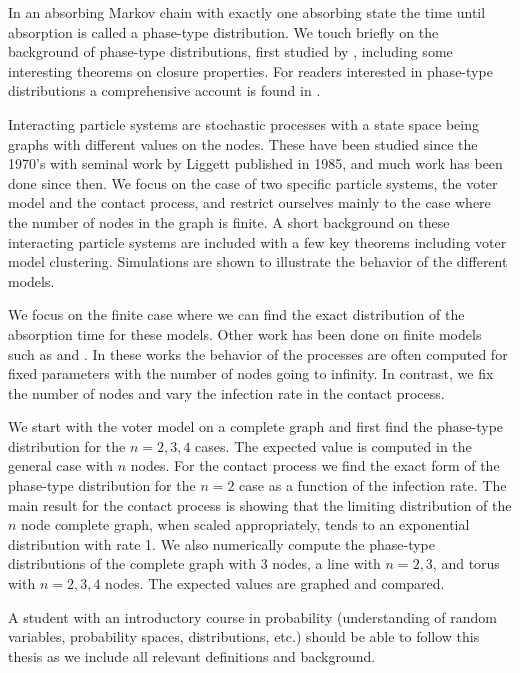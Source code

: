 In an absorbing Markov chain with exactly one absorbing state the time until absorption is called a phase-type distribution.
We touch briefly on the background of phase-type distributions, first studied by \cite{neuts1975}, including some interesting theorems on closure properties.
For readers interested in phase-type distributions a comprehensive account is found in \cite{neuts1981}.

Interacting particle systems are stochastic processes with a state space being graphs with different values on the nodes.
These have been studied since the 1970's with seminal work by Liggett published in 1985, and much work has been done since then.
We focus on the case of two specific particle systems, the voter model and the contact process, and restrict ourselves mainly to the case where the number of nodes in the graph is finite.
A short background on these interacting particle systems are included with a few key theorems including voter model clustering.
Simulations are shown to illustrate the behavior of the different models.

We focus on the finite case where we can find the exact distribution of the absorption time for these models.
Other work has been done on finite models such as \cite{cox1989} and \cite{durrett1988}.
In these works the behavior of the processes are often computed for fixed parameters with the number of nodes going to infinity.
In contrast, we fix the number of nodes and vary the infection rate in the contact process.

We start with the voter model on a complete graph and first find the phase-type distribution for the $n = 2,3,4$ cases.
The expected value is computed in the general case with $n$ nodes.
For the contact process we find the exact form of the phase-type distribution for the $n = 2$ case as a function of the infection rate.
The main result for the contact process is showing that the limiting distribution of the $n$ node complete graph, when scaled appropriately, tends to an exponential distribution with rate 1.
We also numerically compute the phase-type distributions of the complete graph with 3 nodes, a line with $n = 2, 3$, and torus with $n = 2,3,4$ nodes.
The expected values are graphed and compared.

A student with an introductory course in probability (understanding of random variables, probability spaces, distributions, etc.) should be able to follow this thesis as we include all relevant definitions and background.



